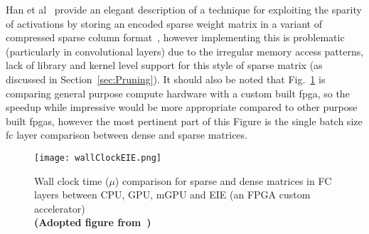 \documentclass[../../D1.tex]{subfiles}
\begin{document}
Han et al~\autocite{hanEIEEfficientInference2016} provide an elegant description of a technique for exploiting the sparity of activations by storing an encoded sparse weight matrix in a variant of compressed sparse column format~\autocite{vuducAutomaticPerformanceTuning}, however implementing this is problematic (particularly in convolutional layers) due to the irregular memory access patterns, lack of library and kernel level support for this style of sparse matrix (as discussed in Section~\ref{sec:Pruning}). 
It should also be noted that Fig.~\ref{fig:wallClockEIE} is comparing general purpose compute hardware with a custom built \acrshort{fpga}, so the speedup while impressive would be more appropriate compared to other purpose built \acrshort{fpga}s, however the most pertinent part of this Figure is the single batch size \acrshort{fc} layer comparison between dense and sparse matrices.


\begin{figure}[H]
    \texttt{[image: wallClockEIE.png]} 
    \caption{Wall clock time ($\mu$) comparison for sparse and dense matrices in FC layers between CPU, GPU, mGPU and EIE (an FPGA custom accelerator)\\ \textbf{(Adopted figure from~\autocite{hanEIEEfficientInference2016})}}
    \label{fig:wallClockEIE}   
\end{figure}
\end{document}
